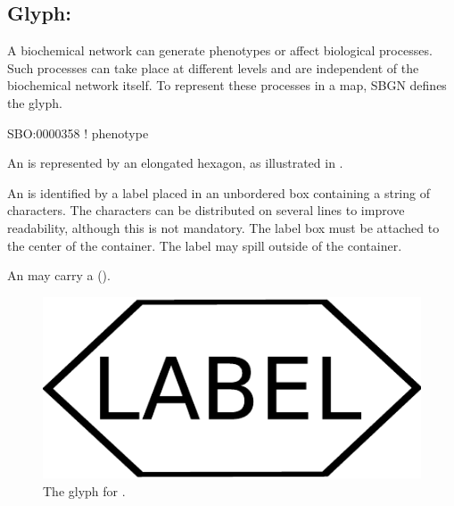 
\subsection{Glyph: }
\label{sec:phenotype}

A biochemical network can generate phenotypes or affect biological
processes.  Such processes can take place at different levels and are
independent of the biochemical network itself.  To represent these
processes in a map, SBGN defines the  glyph.

\begin{glyphDescription}

\glyphSboTerm SBO:0000358 ! phenotype

\glyphContainer An  is represented by an elongated
hexagon, as illustrated in .

\glyphLabel An  is identified by a label placed in an
unbordered box containing a string of characters.  The characters can be
distributed on several lines to improve readability, although this is not
mandatory.  The label box must be attached to the center of the
 container.  The label may spill outside of the container.

\glyphAux An  may carry a 
().

\end{glyphDescription}
 
\begin{figure}[H]
  \centering
  \includegraphics[scale = 0.3]{images/phenotype}
  \caption{The \PD glyph for .}
  \label{fig:phenotype}
\end{figure}

